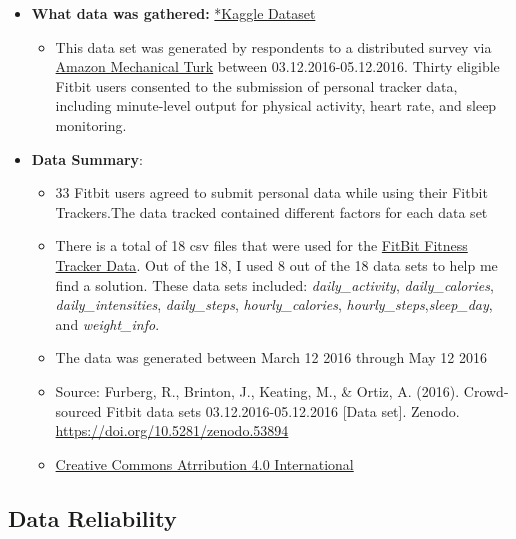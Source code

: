 \documentclass[
]{article}
\providecommand{\tightlist}{%
  \setlength{\itemsep}{0pt}\setlength{\parskip}{0pt}}
\begin{document}
\begin{itemize}
\tightlist
\item
  \textbf{What data was gathered:}
  \href{https://www.kaggle.com/datasets/arashnic/fitbit}{*Kaggle
  Dataset}

  \begin{itemize}
  \tightlist
  \item
    This data set was generated by respondents to a distributed survey
    via \href{https://zenodo.org/record/53894\#.YMoUpnVKiP9}{Amazon
    Mechanical Turk} between 03.12.2016-05.12.2016. Thirty eligible
    Fitbit users consented to the submission of personal tracker data,
    including minute-level output for physical activity, heart rate, and
    sleep monitoring.
  \end{itemize}
\item
  \textbf{Data Summary}:

  \begin{itemize}
  \tightlist
  \item
    33 Fitbit users agreed to submit personal data while using their
    Fitbit Trackers.The data tracked contained different factors for
    each data set
  \item
    There is a total of 18 csv files that were used for the
    \href{https://www.kaggle.com/datasets/arashnic/fitbit}{FitBit
    Fitness Tracker Data}. Out of the 18, I used 8 out of the 18 data
    sets to help me find a solution. These data sets included:
    \emph{daily\_activity}, \emph{daily\_calories},
    \emph{daily\_intensities}, \emph{daily\_steps},
    \emph{hourly\_calories}, \emph{hourly\_steps},\emph{sleep\_day}, and
    \emph{weight\_info}.
  \item
    The data was generated between March 12 2016 through May 12 2016
  \item
    Source: Furberg, R., Brinton, J., Keating, M., \& Ortiz, A. (2016).
    Crowd-sourced Fitbit data sets 03.12.2016-05.12.2016 {[}Data set{]}.
    Zenodo. \url{https://doi.org/10.5281/zenodo.53894}
  \item
    \href{https://creativecommons.org/licenses/by/4.0/legalcode}{Creative
    Commons Atrribution 4.0 International}
  \end{itemize}
\end{itemize}

\hypertarget{data-reliability}{%
\subsection{\texorpdfstring{\textbf{Data
Reliability}}{Data Reliability}}\label{data-reliability}}
\end{document}
